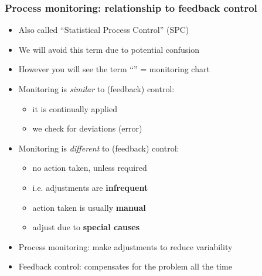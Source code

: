 \begin{frame}\frametitle{Process monitoring: relationship to feedback control}
	\begin{itemize}
		\item	Also called ``Statistical Process Control'' (SPC)
		\item	We will avoid this term due to potential confusion
		\item	However you will see the term ``{\color{purple}{control chart}}'' = monitoring chart
		\item	Monitoring is \emph{similar} to (feedback) control:
		\begin{itemize}
			\item	it is continually applied
			\item	we check for deviations (error)
		\end{itemize}
		\item	Monitoring is \emph{different} to (feedback) control:
		\begin{itemize}
			\item	no action taken, unless required
			\item	i.e. adjustments are \textbf{infrequent}
			\item	action taken is usually \textbf{manual}
			\item	adjust due to \textbf{special causes}
		\end{itemize}
	\end{itemize}
	\begin{itemize}
		\item	Process monitoring: make {} adjustments to reduce variability
		\item	Feedback control: {} compensates for the problem all the time
	\end{itemize}
\end{frame}

